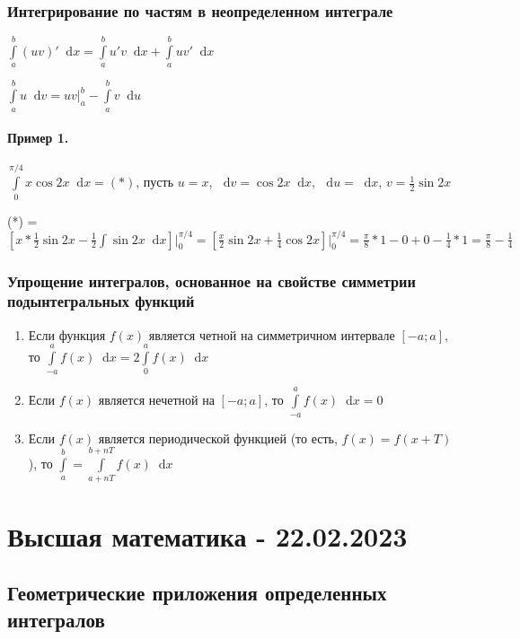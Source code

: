 \documentclass{article}
\newcommand*\diff{\mathop{}\!\mathrm{d}}
\begin{document}
\subsubsection{Интегрирование по частям в неопределенном интеграле}

$\int\limits_{a}^{b} (u v)' \diff x = \int\limits_{a}^{b} u' v \diff x + \int\limits_{a}^{b} u v' \diff x$

$\int\limits_{a}^{b} u \diff v = u v \bigg|_{a}^{b} - \int\limits_{a}^{b} v \diff u$

\paragraph{Пример 1. } $\int\limits_{0}^{\pi/4} x \cos 2x \diff x = (*)$, пусть $u = x$, $\diff v = \cos 2 x \diff x$, $\diff u = \diff x$, $v = \frac{1}{2} \sin 2x$

(*) = $[ x * \frac{1}{2} \sin 2 x - \frac{1}{2} \int \sin 2 x \diff x] \bigg|_{0}^{\pi/4} = [\frac{x}{2} \sin 2x + \frac{1}{4} \cos 2x] \bigg|_{0}^{\pi/4} = \frac{\pi}{8} * 1 - 0 + 0 - \frac{1}{4} * 1 = \frac{\pi}{8} - \frac{1}{4}$

\subsubsection{Упрощение интегралов, основанное на свойстве симметрии подынтегральных функций}

\begin{enumerate}
    \item Если функция $f(x)$ является четной на симметричном интервале $[-a; a]$, то $\int\limits_{-a}^{a} f(x) \diff x = 2 \int\limits_{0}^{a} f(x) \diff x$
    \item Если $f(x)$ является нечетной на $[-a; a]$, то $\int\limits_{-a}^{a} f(x) \diff x = 0$
    \item Если $f(x)$ является периодической функцией (то есть, $f(x) = f(x + T)$), то $\int\limits_{a}^{b} = \int\limits_{a + n T}^{b + n T} f(x) \diff x$
\end{enumerate}

\pagebreak
\section{Высшая математика - 22.02.2023}

\subsection{Геометрические приложения определенных интегралов}
\end{document}
